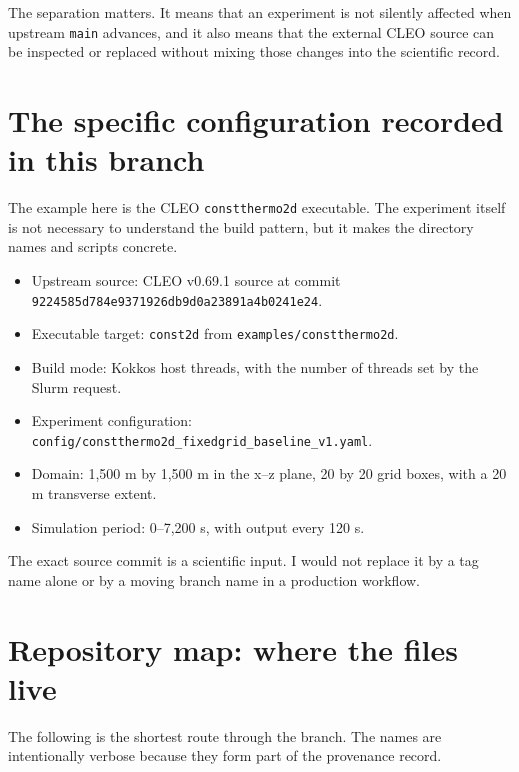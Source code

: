 \documentclass[11pt,a4paper]{article}
\begin{document}
The separation matters. It means that an experiment is not silently affected when upstream \texttt{main} advances, and it also means that the external CLEO source can be inspected or replaced without mixing those changes into the scientific record.

\section{The specific configuration recorded in this branch}

The example here is the CLEO \texttt{constthermo2d} executable. The experiment itself is not necessary to understand the build pattern, but it makes the directory names and scripts concrete.

\begin{itemize}
  \item Upstream source: CLEO v0.69.1 source at commit \texttt{9224585d784e9371926db9d0a23891a4b0241e24}.
  \item Executable target: \texttt{const2d} from \texttt{examples/constthermo2d}.
  \item Build mode: Kokkos host threads, with the number of threads set by the Slurm request.
  \item Experiment configuration: \texttt{config/constthermo2d\_fixedgrid\_baseline\_v1.yaml}.
  \item Domain: 1,500 m by 1,500 m in the x--z plane, 20 by 20 grid boxes, with a 20 m transverse extent.
  \item Simulation period: 0--7,200 s, with output every 120 s.
\end{itemize}

The exact source commit is a scientific input. I would not replace it by a tag name alone or by a moving branch name in a production workflow.

\section{Repository map: where the files live}

The following is the shortest route through the branch. The names are intentionally verbose because they form part of the provenance record.
\end{document}
